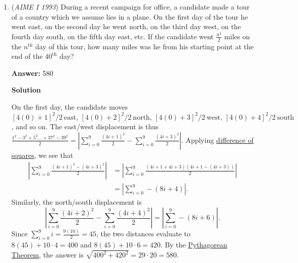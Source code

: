 \begin{enumerate}
 Again, we take care of restrictions first. This time there are 5 choices for the last digit, which are all the even numbers because 5 is odd.

 Now that there are no restrictions we proceed to find that there are $8$ choices for the hundreds digit and $7$ choices for the tens digit. Therefore we have $8 \cdot 7 \cdot 5 = 280$ numbers that satisfy the conditions posed by the problem.

 Case $3$

 Here we let thousands digit be $6$.

 6 \_ \_ \_ 

 Once again, we take care of restrictions first. Since 6 is even,  there are 4 choices for the last digit, namely $2$,$6$,$8$ and $0$

 Now we proceed to find that there are $8$ choices for the hundreds digit and $7$ choices for the tens digit. Therefore we have $8 \cdot 7 \cdot 4 = 224$ numbers that satisfy the conditions posed by the problem.

 Now that we have our answers for each possible thousands place digit, we add up our answers and get $224+280+224$= $\boxed{728}$~PEKKA

 


	\item (\textit{AIME I 1993}) During a recent campaign for office, a candidate made a tour of a country which we assume lies in a plane. On the first day of the tour he went east, on the second day he went north, on the third day west, on the fourth day south, on the fifth day east, etc. If the candidate went $\frac{n^{2}}{2}$ miles on the $n^{\mbox{th}}_{}$ day of this tour, how many miles was he from his starting point at the end of the $40^{\mbox{th}}_{}$ day? 


 
 \textbf{Answer: }580



\textbf{Solution}

On the first day, the candidate moves $[4(0) + 1]^2/2\ \text{east},\, [4(0) + 2]^2/2\ \text{north},\, [4(0) + 3]^2/2\ \text{west},\, [4(0) + 4]^2/2\ \text{south}$, and so on. The east/west displacement is thus $\frac{1^2 - 3^2 + 5^2 \ldots +37^2 - 39^2}{2} = \left|\sum_{i=0}^9 \frac{(4i+1)^2}{2} - \sum_{i=0}^9 \frac{(4i+3)^2}{2}\right|$. Applying \href{https://artofproblemsolving.com/wiki/index.php?title=Difference\_of\_squares}{difference of squares}, we see that 
 \begin{align*} \left|\sum_{i=0}^9 \frac{(4i+1)^2 - (4i+3)^2}{2}\right| &= \left|\sum_{i=0}^9 \frac{(4i+1+4i+3)(4i+1-(4i+3))}{2}\right|\\ &= \left|\sum_{i=0}^9 -(8i+4) \right|. \end{align*}
Similarly, the north/south displacement is 
 \[\left|\sum_{i=0}^9 \frac{(4i+2)^2}{2} - \sum_{i=0}^9 \frac{(4i+4)^2}{2}\right| = \left|\sum_{i=0}^9 -(8i+6) \right|.\]Since $\sum_{i=0}^{9} i = \frac{9(10)}{2} = 45$, the two distances evaluate to $8(45) + 10\cdot 4 = 400$ and $8(45) + 10\cdot 6 = 420$. By the \href{https://artofproblemsolving.com/wiki/index.php?title=Pythagorean\_Theorem}{Pythagorean Theorem}, the answer is $\sqrt{400^2 + 420^2} = 29 \cdot 20 = \boxed{580}$.


\end{enumerate}
